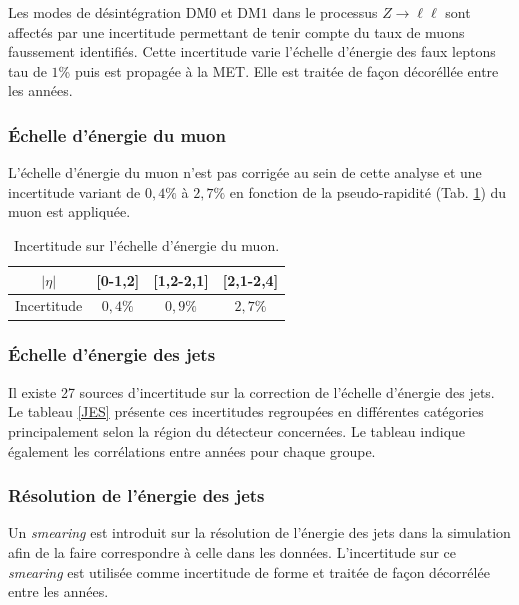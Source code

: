 Les modes de désintégration DM$0$ et DM$1$ dans le processus $Z\rightarrow\ell\ell$ sont affectés par une incertitude permettant de tenir compte du taux de muons faussement identifiés. Cette incertitude varie l'échelle d'énergie des faux leptons tau de $1$\% puis est propagée à la MET.  Elle est traitée de façon décoréllée entre les années.

\subsubsection{ Échelle d'énergie du muon}

L'échelle d'énergie du muon n'est pas corrigée au sein de cette analyse et une incertitude variant de $0,4\%$ à $2,7\%$ en fonction de la pseudo-rapidité (Tab. \ref{muInc}) du muon est appliquée.

\begin{table}[!ht]
\centering
\begin{tabular}{|l|c|c|c|}
\hline
\multicolumn{1}{|c|}{$|\eta|$} & {[}0-1,2{]} & {[}1,2-2,1{]} & {[}2,1-2,4{]} \\ \hline
Incertitude                    & $0,4\%$     & $0,9\%$       & $2,7\%$       \\ \hline
\end{tabular}
\caption{Incertitude sur l'échelle d'énergie du muon.}
\label{muInc}
\end{table}

\subsubsection{ Échelle d'énergie des jets}

Il existe 27 sources d'incertitude sur la correction de l'échelle d'énergie des jets. Le tableau \ref{JES} présente ces incertitudes regroupées en différentes catégories principalement selon la région du détecteur concernées. Le tableau indique également les corrélations entre années pour chaque groupe.



\subsubsection{ Résolution de l'énergie des jets}

Un \textit{smearing} est introduit sur la résolution de l'énergie des jets dans la simulation afin de la faire correspondre à celle dans les données. L'incertitude sur ce \textit{smearing} est utilisée comme incertitude de forme et traitée de façon décorrélée entre les années.

